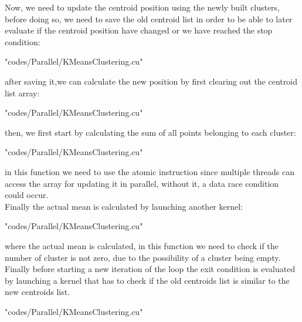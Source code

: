 \documentclass[10pt,twocolumn,letterpaper]{article}
\begin{document}
Now, we need to update the centroid position using the newly built clusters, before doing so, we need to save the old centroid list in
order to be able to later evaluate if the centroid position have changed or we have reached the stop condition:\\
\begin{lstinputlisting}[language=C,style=CSnippetStyle,caption=CUDA Centroid List Backup,firstline=287,lastline=287]{
	"codes/Parallel/KMeansClustering.cu"}
\end{lstinputlisting}
after saving it,we can calculate the new position by first clearing out the centroid list array:\\
\begin{lstinputlisting}[language=C,style=CSnippetStyle,caption=CUDA Centroid Position Update,firstline=179,lastline=180]{
	"codes/Parallel/KMeansClustering.cu"}
\end{lstinputlisting}
then, we first start by calculating the sum of all points belonging to each cluster:\\
\begin{lstinputlisting}[language=C,style=CSnippetStyle,caption=CUDA Mean Sum Calculation,firstline=46,lastline=59]{
	"codes/Parallel/KMeansClustering.cu"}
\end{lstinputlisting}
in this function we need to use the atomic instruction since multiple threads can access the array for updating it in parallel, without 
it, a data race condition could occur.\\
Finally the actual mean is calculated by launching another kernel:\\
\begin{lstinputlisting}[language=C,style=CSnippetStyle,caption=CUDA Mean Calculation,firstline=33,lastline=45]{
	"codes/Parallel/KMeansClustering.cu"}
\end{lstinputlisting}
where the actual mean is calculated, in this function we need to check if the number of cluster is not zero, due to the possibility of
a cluster being empty.\\
Finally before starting a new iteration of the loop the exit condition is evaluated by launching a kernel that has to check if the old
centroids list is similar to the new centroids list.\\
\begin{lstinputlisting}[language=C,style=CSnippetStyle,caption=CUDA Exit Condition Calculator Kernel,firstline=18,lastline=32]{
	"codes/Parallel/KMeansClustering.cu"}
\end{lstinputlisting}
\end{document}
